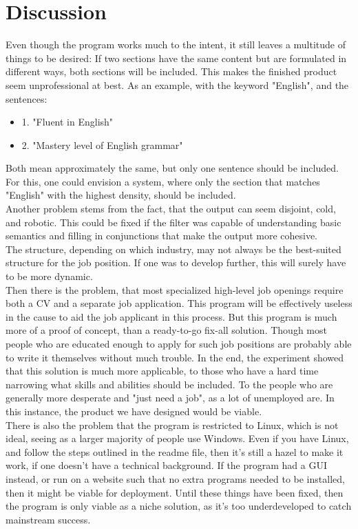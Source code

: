 \section{Discussion}\label{sec:discussion}
Even though the program works much to the intent, it still leaves a multitude of things to be desired:
If two sections have the same content but are formulated in different ways, both sections will be included.
This makes the finished product seem unprofessional at best. As an example, with the keyword "English", and the sentences:
\begin{itemize}
  \item 1. "Fluent in English"
  \item 2. "Mastery level of English grammar"
\end{itemize}
Both mean approximately the same, but only one sentence should be included. For this, one could envision a system, 
where only the section that matches "English" with the highest density, should be included.\\

Another problem stems from the fact, that the output can seem disjoint, cold, and robotic. 
This could be fixed if the filter was capable of understanding basic semantics and filling in conjunctions that make the output more cohesive.\\

The structure, depending on which industry, may not always be the best-suited structure for the job position. 
If one was to develop further, this will surely have to be more dynamic.\\

Then there is the problem, that most specialized high-level job openings require both a CV and a separate job application. 
This program will be effectively useless in the cause to aid the job applicant in this process.
But this program is much more of a proof of concept, than a ready-to-go fix-all solution.
Though most people who are educated enough to apply for such job positions are probably able to write it themselves without much trouble.
In the end, the experiment showed that this solution is much more applicable, to those who have a hard time narrowing what skills and abilities should be included.
To the people who are generally more desperate and "just need a job", as a lot of unemployed are.
In this instance, the product we have designed would be viable.\\

There is also the problem that the program is restricted to Linux, which is not ideal, seeing as a larger majority of people use Windows.
Even if you have Linux, and follow the steps outlined in the readme file, then it's still a hazel to make it work, if one doesn't have a technical background.
If the program had a GUI instead, or run on a website such that no extra programs needed to be installed, then it might be viable for deployment.
Until these things have been fixed, then the program is only viable as a niche solution, as it's too underdeveloped to catch mainstream success.

\clearpage
  